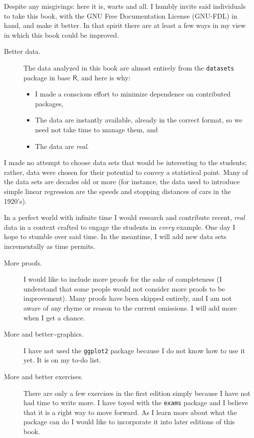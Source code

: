 \documentclass[captions=tableheading]{scrbook}
\begin{document}
Despite any misgivings: here it is, warts and all. I humbly invite said individuals to take this book, with the GNU Free Documentation License (GNU-FDL) in hand, and make it better. In that spirit there are at least a few ways in my view in which this book could be improved.

\begin{description}
\item[Better data.] The data analyzed in this book are almost entirely from the \texttt{datasets} package in base \(\mathsf{R}\), and here is why:
\begin{itemize}
\item I made a conscious effort to minimize dependence on contributed packages,
\item The data are instantly available, already in the correct format, so we need not take time to manage them, and
\item The data are \emph{real}.
\end{itemize}
\end{description}

I made no attempt to choose data sets that would be interesting to the students; rather, data were chosen for their potential to convey a statistical point. Many of the data sets are decades old or more (for instance, the data used to introduce simple linear regression are the speeds and stopping distances of cars in the 1920's).

In a perfect world with infinite time I would research and contribute recent, \emph{real} data in a context crafted to engage the students in \emph{every} example. One day I hope to stumble over said time. In the meantime, I will add new data sets incrementally as time permits.

\begin{description}
\item[More proofs.] I would like to include more proofs for the sake of completeness (I understand that some people would not consider more proofs to be improvement). Many proofs have been skipped entirely, and I am not aware of any rhyme or reason to the current omissions. I will add more when I get a chance.
\item[More and better\~{}graphics.] I have not used the \texttt{ggplot2} package \cite{Wickam2009} because I do not know how to use it yet. It is on my to-do list.
\item[More and better exercises.] There are only a few exercises in the first edition simply because I have not had time to write more. I have toyed with the \texttt{exams} package \cite{exams} and I believe that it is a right way to move forward. As I learn more about what the package can do I would like to incorporate it into later editions of this book.
\end{description}
\end{document}
